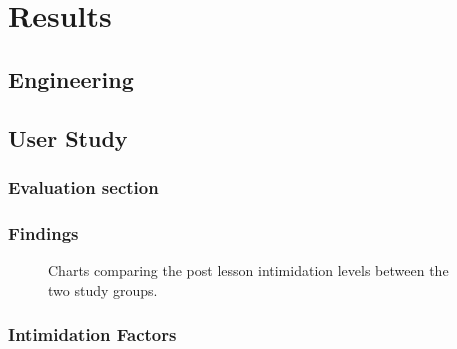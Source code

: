 \chapter{Results}
\label{chap:results}


\section{Engineering}

\section{User Study}

\subsection{Evaluation section}


\subsection{Findings}

\begin{figure}[htbp]
	\centering
	\scalebox{0.67}{}
	\vspace{-2em}
	\caption{Charts comparing the post lesson intimidation levels between the two study groups.}
	\label{fig:confidence}
\end{figure}

\subsection{Intimidation Factors}
